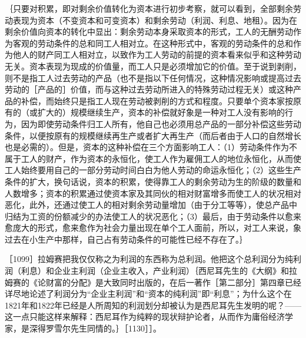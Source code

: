 ｛只要对积累，即对剩余价值转化为资本进行初步考察，就可以看到，全部剩余劳动表现为资本（不变资本和可变资本）和剩余劳动（利润、利息、地租）。因为在剩余价值向资本的转化中显出：剩余劳动本身采取资本的形式，工人的无酬劳动作为客观的劳动条件的总和同工人相对立。在这种形式中，客观的劳动条件的总和作为他人的财产同工人相对立，以致作为工人劳动的前提的资本看来似乎和这种劳动无关。资本表现为现成的价值量，而工人只是必须增加它的价值。至于说到剥削，则不是指工人过去劳动的产品（也不是指以下任何情况，这种情况影响或提高过去劳动的［产品的］价值，而与这种过去劳动所进入的特殊劳动过程无关）或这种产品的补偿，而始终只是指工人现在劳动被剥削的方式和程度。只要单个资本家按原有的（或扩大的）规模继续生产，资本的补偿就好象是一种对工人没有影响的行为，因为即使劳动条件归工人所有，他自己也必须用总产品的一部分补偿这些劳动条件，以便按原有的规模继续再生产或者扩大再生产（而后者由于人口的自然增长也是必需的）。但是，资本的这种补偿在三个方面影响工人：（1）劳动条件作为不属于工人的财产，作为资本的永恒化，使工人作为雇佣工人的地位永恒化，从而使工人始终要用自己的一部分劳动时间白白为他人劳动的命运永恒化；（2）这些生产条件的扩大，换句话说，资本的积累，使得靠工人的剩余劳动为生的阶级的数量和人数增多；资本的积累通过使资本家及其同伙的相对财富增多而使工人的状况相对恶化，此外，还通过使工人的相对剩余劳动量增加（由于分工等等），使总产品中归结为工资的份额减少的办法使工人的状况恶化；（3）最后，由于劳动条件以愈来愈庞大的形式，愈来愈作为社会力量出现在单个工人面前，所以，对工人来说，象过去在小生产中那样，自己占有劳动条件的可能性已经不存在了。｝


［1099］拉姆赛把我仅仅称之为利润的东西称为总利润。他把这个总利润分为纯利润（利息）和企业主利润（企业主收入，产业利润）｛西尼耳先生的《大纲》和拉姆赛的《论财富的分配》是大致同时出版的，在后一著作［第二部分］第四章已经详尽地论述了利润分为“企业主利润”和“资本的纯利润”即“利息”；为什么这个在1821年和1822年已经是人所周知的利润划分却被认为是西尼耳先生发明的呢？——这一点只能这样来解释：西尼耳作为纯粹的现状辩护论者，从而作为庸俗经济学家，是深得罗雪尔先生同情的。｝［1130］］。

